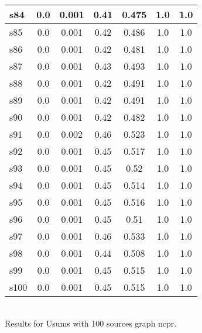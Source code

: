 \documentclass{article}
\begin{document}
\begin{tabular}{|l|c|c|c|c|c|c|}
\hline
s84 &0.0 & 0.001 & 0.41 & 0.475 & 1.0 & 1.0\\
\hline
s85 &0.0 & 0.001 & 0.42 & 0.486 & 1.0 & 1.0\\
\hline
s86 &0.0 & 0.001 & 0.42 & 0.481 & 1.0 & 1.0\\
\hline
s87 &0.0 & 0.001 & 0.43 & 0.493 & 1.0 & 1.0\\
\hline
s88 &0.0 & 0.001 & 0.42 & 0.491 & 1.0 & 1.0\\
\hline
s89 &0.0 & 0.001 & 0.42 & 0.491 & 1.0 & 1.0\\
\hline
s90 &0.0 & 0.001 & 0.42 & 0.482 & 1.0 & 1.0\\
\hline
s91 &0.0 & 0.002 & 0.46 & 0.523 & 1.0 & 1.0\\
\hline
s92 &0.0 & 0.001 & 0.45 & 0.517 & 1.0 & 1.0\\
\hline
s93 &0.0 & 0.001 & 0.45 & 0.52 & 1.0 & 1.0\\
\hline
s94 &0.0 & 0.001 & 0.45 & 0.514 & 1.0 & 1.0\\
\hline
s95 &0.0 & 0.001 & 0.45 & 0.516 & 1.0 & 1.0\\
\hline
s96 &0.0 & 0.001 & 0.45 & 0.51 & 1.0 & 1.0\\
\hline
s97 &0.0 & 0.001 & 0.46 & 0.533 & 1.0 & 1.0\\
\hline
s98 &0.0 & 0.001 & 0.44 & 0.508 & 1.0 & 1.0\\
\hline
s99 &0.0 & 0.001 & 0.45 & 0.515 & 1.0 & 1.0\\
\hline
s100 &0.0 & 0.001 & 0.45 & 0.515 & 1.0 & 1.0\\
\hline
\end{tabular}\\

\noindent Results for Usums with 100 sources graph ncpr.
\end{document}
